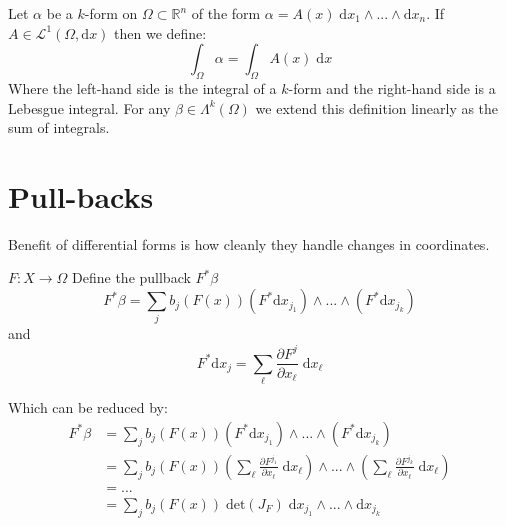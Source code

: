 \begin{definition}
Let $\alpha$ be a $k$-form on $\Omega \subset \mathbb{R}^n$ of the form $\alpha = A(x) \; \text{d}x_1 \wedge ... \wedge \text{d} x_n$.
If $A \in \mathcal{L}^1 (\Omega , \text{d}x)$ then we define:
\begin{equation}
\int_\Omega \alpha = \int_\Omega A(x) \; \text{d}x
\end{equation}
Where the left-hand side is the integral of a $k$-form and the right-hand side is a Lebesgue integral.
For any $\beta \in \Lambda^k (\Omega)$ we extend this definition linearly as the sum of integrals.
\end{definition}

%
%

\section{Pull-backs}

Benefit of differential forms is how cleanly they handle changes in coordinates.

\begin{definition}
$F: X \to \Omega$
Define the pullback $F^* \beta$
\begin{equation}
F^* \beta = \sum_j  b_j ( F(x)) (F^* \text{d}x_{j_1}) \wedge ... \wedge (F^* \text{d} x_{j_k})
\end{equation}
and
\begin{equation}
F^* \text{d}x_j = \sum_\ell \frac{\partial F^j}{\partial x_\ell} \; \text{d} x_\ell
\end{equation}
\end{definition}

Which can be reduced by:
\begin{align}
F^ * \beta & = \sum_j  b_j ( F(x)) (F^* \text{d}x_{j_1}) \wedge ... \wedge (F^* \text{d} x_{j_k}) \\
& = \sum_j  b_j ( F(x))  
\left( \sum_\ell \frac{\partial F^{j_1}}{\partial x_\ell} \; \text{d} x_\ell \right)
\wedge ... \wedge  
\left( \sum_\ell \frac{\partial F^{j_k}}{\partial x_\ell} \; \text{d} x_\ell \right) \\
& = ... \\
& = \sum_j b_j ( F(x)) \; \text{det}\left( J_F \right) \; \text{d}x_{j_1} \wedge ... \wedge \text{d} x_{j_k}
\end{align}

